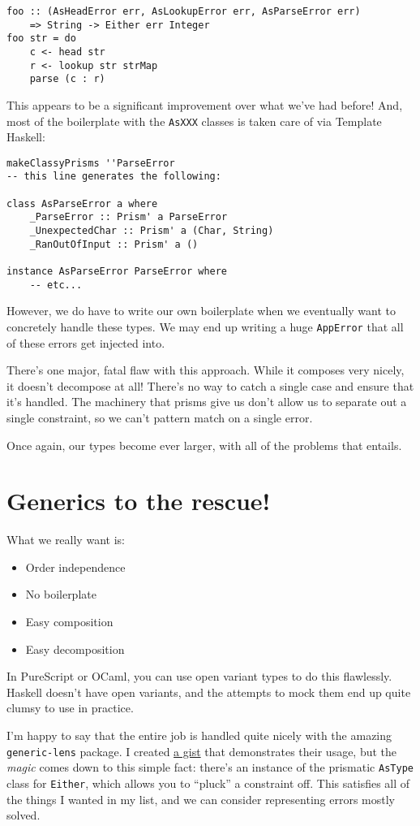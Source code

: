 \begin{verbatim}
foo :: (AsHeadError err, AsLookupError err, AsParseError err)
    => String -> Either err Integer
foo str = do
    c <- head str
    r <- lookup str strMap
    parse (c : r)
\end{verbatim}
This appears to be a significant improvement over what we've had before! And, most of the boilerplate with the \texttt{AsXXX} classes is taken care of via Template Haskell:

\begin{verbatim}
makeClassyPrisms ''ParseError
-- this line generates the following:

class AsParseError a where
    _ParseError :: Prism' a ParseError
    _UnexpectedChar :: Prism' a (Char, String)
    _RanOutOfInput :: Prism' a ()

instance AsParseError ParseError where
    -- etc...
\end{verbatim}
However, we do have to write our own boilerplate when we eventually want to concretely handle these types. We may end up writing a huge \texttt{AppError} that all of these errors get injected into.

There's one major, fatal flaw with this approach. While it composes very nicely, it doesn't decompose at all! There's no way to catch a single case and ensure that it's handled. The machinery that prisms give us don't allow us to separate out a single constraint, so we can't pattern match on a single error.

Once again, our types become ever larger, with all of the problems that entails.

\section{Generics to the rescue!}


What we really want is:

\begin{itemize}
\item Order independence
\item No boilerplate
\item Easy composition
\item Easy decomposition
\end{itemize}
In PureScript or OCaml, you can use open variant types to do this flawlessly. Haskell doesn't have open variants, and the attempts to mock them end up quite clumsy to use in practice.

I'm happy to say that the entire job is handled quite nicely with the amazing \texttt{generic-lens} package. I created \href{https://gist.github.com/parsonsmatt/880fbf79eaad6ed863786c6c02f8ddc9}{a gist} that demonstrates their usage, but the \textit{magic} comes down to this simple fact: there's an instance of the prismatic \texttt{AsType} class for \texttt{Either}, which allows you to ``pluck'' a constraint off. This satisfies all of the things I wanted in my list, and we can consider representing errors mostly solved.

